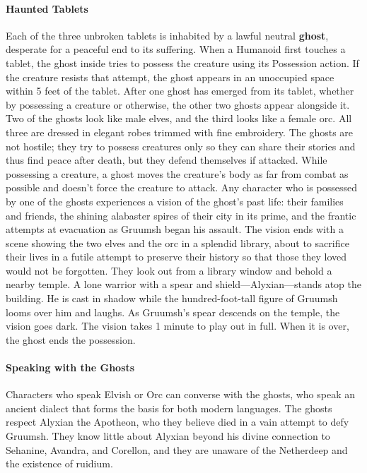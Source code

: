 \documentclass[10pt,a4,twoside,twocolumn,openany,nodeprecatedcode]{dndbook}
\begin{document}
\paragraph{Haunted Tablets}
Each of the three unbroken tablets is inhabited by a lawful neutral \textbf{ghost}, desperate for a peaceful end to its suffering. When a Humanoid first touches a tablet, the ghost inside tries to possess the creature using its Possession action. If the creature resists that attempt, the ghost appears in an unoccupied space within 5 feet of the tablet. After one ghost has emerged from its tablet, whether by possessing a creature or otherwise, the other two ghosts appear alongside it.
Two of the ghosts look like male elves, and the third looks like a female orc. All three are dressed in elegant robes trimmed with fine embroidery. The ghosts are not hostile; they try to possess creatures only so they can share their stories and thus find peace after death, but they defend themselves if attacked. While possessing a creature, a ghost moves the creature's body as far from combat as possible and doesn't force the creature to attack.
Any character who is possessed by one of the ghosts experiences a vision of the ghost's past life: their families and friends, the shining alabaster spires of their city in its prime, and the frantic attempts at evacuation as Gruumsh began his assault. The vision ends with a scene showing the two elves and the orc in a splendid library, about to sacrifice their lives in a futile attempt to preserve their history so that those they loved would not be forgotten. They look out from a library window and behold a nearby temple. A lone warrior with a spear and shield—Alyxian—stands atop the building. He is cast in shadow while the hundred-foot-tall figure of Gruumsh looms over him and laughs. As Gruumsh's spear descends on the temple, the vision goes dark. The vision takes 1 minute to play out in full. When it is over, the ghost ends the possession.
\paragraph{Speaking with the Ghosts}
Characters who speak Elvish or Orc can converse with the ghosts, who speak an ancient dialect that forms the basis for both modern languages. The ghosts respect Alyxian the Apotheon, who they believe died in a vain attempt to defy Gruumsh. They know little about Alyxian beyond his divine connection to Sehanine, Avandra, and Corellon, and they are unaware of the Netherdeep and the existence of ruidium.
\end{document}

